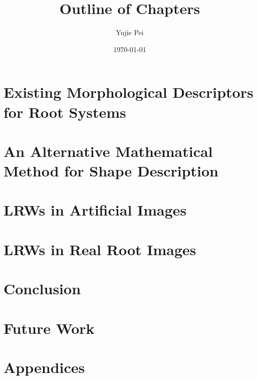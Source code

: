\documentclass{article}
\title{Outline of Chapters}
\author{Yujie Pei}
\date{\today}
\begin{document}
\maketitle

\tableofcontents

\newpage

\section{Existing Morphological Descriptors for Root Systems}
  


\newpage
  
\section{An Alternative Mathematical Method for Shape Description}
    


\newpage



\newpage

\section{LRWs in Artificial Images}
  


\newpage

\section{LRWs in Real Root Images}
  


\newpage
\section{Conclusion}


\newpage

\section{Future Work}

\newpage


\section{Appendices}
  

\newpage
  
\printbibliography


\newpage
\end{document}
